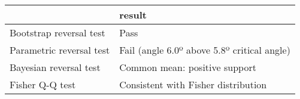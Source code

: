 \begin{tabular}{ll}
\toprule
{} &                                       result \\
\midrule
Bootstrap reversal test  &                                         Pass \\
Parametric reversal test &  Fail (angle 6.0º above 5.8º critical angle) \\
Bayesian reversal test   &                Common mean: positive support \\
Fisher Q-Q test          &          Consistent with Fisher distribution \\
\bottomrule
\end{tabular}
